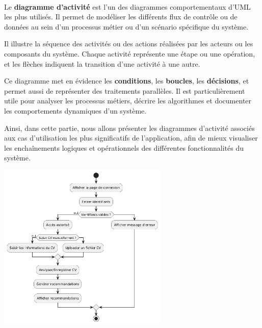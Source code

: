 \paragraph{}\begin{spacing}{1}
Le \textbf{diagramme d’activité} est l’un des diagrammes comportementaux d’UML les plus utilisés. Il permet de modéliser les différents flux de contrôle ou de données au sein d’un processus métier ou d’un scénario spécifique du système.

Il illustre la séquence des activités ou des actions réalisées par les acteurs ou les composants du système. Chaque activité représente une étape ou une opération, et les flèches indiquent la transition d’une activité à une autre.

Ce diagramme met en évidence les \textbf{conditions}, les \textbf{boucles}, les \textbf{décisions}, et permet aussi de représenter des traitements parallèles. Il est particulièrement utile pour analyser les processus métiers, décrire les algorithmes et documenter les comportements dynamiques d’un système.

Ainsi, dans cette partie, nous allons présenter les diagrammes d’activité associés aux cas d’utilisation les plus significatifs de l’application, afin de mieux visualiser les enchaînements logiques et opérationnels des différentes fonctionnalités du système.
\end{spacing}
\includegraphics[width=\linewidth, height=8cm]{images/diagramme activite.png}

